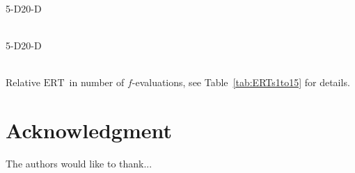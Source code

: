 \documentclass[conference]{IEEEtran}
\newcommand{\bbobdatapath}{ppdata/}
\newcommand{\ERT}{\ensuremath{\mathrm{ERT}}}
\begin{document}
 

\begin{table*}
\centering
\hfill5-D\hfill20-D\hfill~\\[1ex]
\tiny
\mbox{%
\hspace*{1em}%
}
\vspace*{1em}
\caption{\label{tab:ERTs1to15} 
}
\end{table*}



 

\begin{table*}
\centering
\hfill5-D\hfill20-D\hfill~\\[1ex]
\tiny
\mbox{%
\hspace*{1em}%
}
\vspace*{1em}
\caption{\label{tab:ERTs16to30} Relative \ERT\ in number of $f$-evaluations, see Table~\ref{tab:ERTs1to15} for details. 
}
\end{table*}



\section*{Acknowledgment}
The authors would like to thank...
\end{document}
